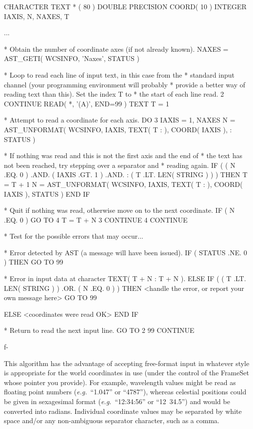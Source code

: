 \documentclass[twoside,11pt]{starlink}
\begin{document}
\begin{small}
\begin{terminalv}
      CHARACTER TEXT * ( 80 )
      DOUBLE PRECISION COORD( 10 )
      INTEGER IAXIS, N, NAXES, T

      ...

*  Obtain the number of coordinate axes (if not already known).
      NAXES = AST_GETI( WCSINFO, 'Naxes', STATUS )

*  Loop to read each line of input text, in this case from the
*  standard input channel (your programming environment will probably
*  provide a better way of reading text than this). Set the index T to
*  the start of each line read.
 2    CONTINUE
      READ( *, '(A)', END=99 ) TEXT
      T = 1

*  Attempt to read a coordinate for each axis.
      DO 3 IAXIS = 1, NAXES
         N = AST_UNFORMAT( WCSINFO, IAXIS, TEXT( T : ), COORD( IAXIS ),
     :                     STATUS )

*  If nothing was read and this is not the first axis and the end of
*  the text has not been reached, try stepping over a separator and
*  reading again.
         IF ( ( N .EQ. 0 ) .AND. ( IAXIS .GT. 1 ) .AND.
     :        ( T .LT. LEN( STRING ) ) ) THEN
            T = T + 1
            N = AST_UNFORMAT( WCSINFO, IAXIS, TEXT( T : ),
                              COORD( IAXIS ), STATUS )
         END IF

*  Quit if nothing was read, otherwise move on to the next coordinate.
         IF ( N .EQ. 0 ) GO TO 4
         T = T + N
 3    CONTINUE
 4    CONTINUE

*  Test for the possible errors that may occur...

*  Error detected by AST (a message will have been issued).
      IF ( STATUS .NE. 0 ) THEN
         GO TO 99

*  Error in input data at character TEXT( T + N : T + N ).
      ELSE IF ( ( T .LT. LEN( STRING ) ) .OR. ( N .EQ. 0 ) ) THEN
         <handle the error, or report your own message here>
         GO TO 99

      ELSE
         <coordinates were read OK>
      END IF

*  Return to read the next input line.
      GO TO 2
 99   CONTINUE
\end{terminalv}
\end{small}
f-

This algorithm has the advantage of accepting free-format input in
whatever style is appropriate for the world coordinates in use (under
the control of the FrameSet whose pointer you provide). For example,
wavelength values might be read as floating point numbers
(\emph{e.g.}\ ``1.047'' or ``4787''), whereas celestial positions
could be given in sexagesimal format (\emph{e.g.}\ ``12:34:56'' or
``12~34.5'') and would be converted into radians. Individual
coordinate values may be separated by white space and/or any
non-ambiguous separator character, such as a comma.
\end{document}
